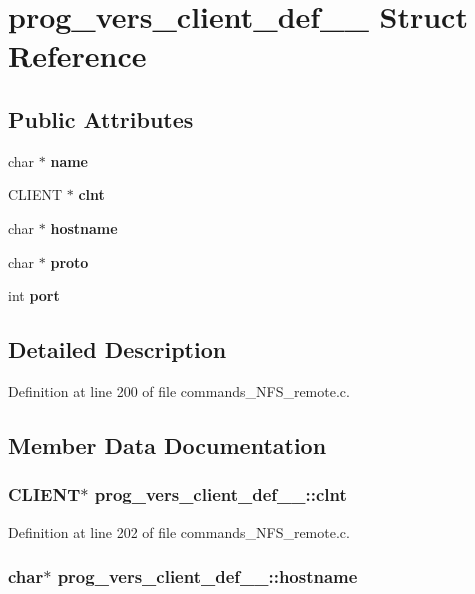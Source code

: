 \section{prog\_\-vers\_\-client\_\-def\_\-\_\- Struct Reference}
\label{structprog__vers__client__def____}
\subsection*{Public Attributes}
\begin{CompactItemize}
\item 
char $\ast$ {\bf name}
\item 
CLIENT $\ast$ {\bf clnt}
\item 
char $\ast$ {\bf hostname}
\item 
char $\ast$ {\bf proto}
\item 
int {\bf port}
\end{CompactItemize}


\subsection{Detailed Description}


Definition at line 200 of file commands\_\-NFS\_\-remote.c.

\subsection{Member Data Documentation}
\subsubsection[{clnt}]{\setlength{\rightskip}{0pt plus 5cm}CLIENT$\ast$ {\bf prog\_\-vers\_\-client\_\-def\_\-\_\-::clnt}}\label{structprog__vers__client__def_____73705521fc089ab40193a33cdbd90c01}




Definition at line 202 of file commands\_\-NFS\_\-remote.c.
\subsubsection[{hostname}]{\setlength{\rightskip}{0pt plus 5cm}char$\ast$ {\bf prog\_\-vers\_\-client\_\-def\_\-\_\-::hostname}}\label{structprog__vers__client__def_____e686f39587dd1adf9a2e03b139ee1f35}




